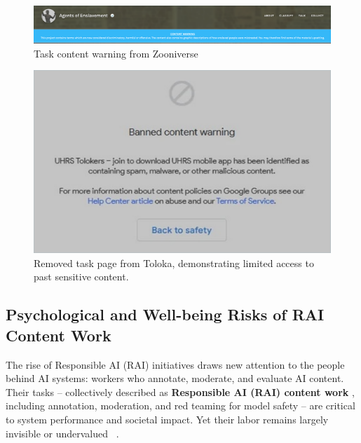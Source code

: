 \begin{figure}
  \centering
  \includegraphics[width=\linewidth]{figures/warning_zooniverse.pdf}
  \caption{Task content warning from Zooniverse}
  \label{fig:zooniverse_removed}
\end{figure}

\begin{figure}
  \centering
  \includegraphics[width=0.7\linewidth]{figures/toloka_removed_task.pdf}
  \caption{Removed task page from Toloka, demonstrating limited access to past sensitive content.}
  \label{fig:toloka_removed}
\end{figure}

\subsection{Psychological and Well-being Risks of RAI Content Work} 
The rise of Responsible AI (RAI) initiatives draws new attention to the people behind AI systems: workers who annotate, moderate, and evaluate AI content. Their tasks -- collectively described as \textbf{Responsible AI (RAI) content work} \cite{qian2025aura}, including annotation, moderation, and red teaming for model safety -- are critical to system performance and societal impact. Yet their labor remains largely invisible or undervalued ~\cite{gray2019ghost}. 

